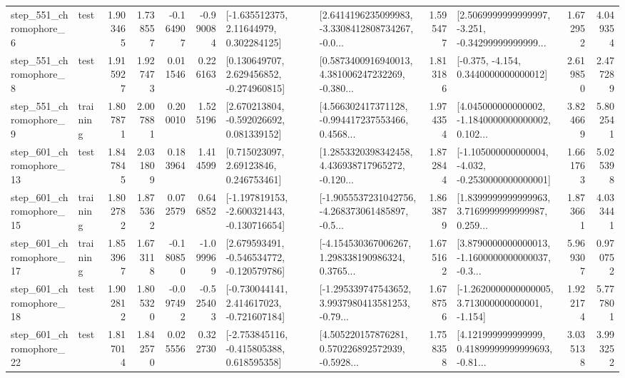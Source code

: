 \begin{tabular}{llrrrrllrlrr}
   step\_551\_chromophore\_6 &      test &      1.903465 &    1.738557 &     -0.164907 & -0.990084 &     [-1.635512375, 2.11644979, 0.302284125] &  [2.6414196235099983, -3.3308412808734267, -0.0... &       1.595477 &  [2.5069999999999997, -3.251, -0.34299999999999... &            1.672952 &          4.049354 \\
   step\_551\_chromophore\_8 &      test &      1.915927 &    1.927473 &      0.011546 &  0.226163 &    [0.130649707, 2.629456852, -0.274960815] &  [0.5873400916940013, 4.381006247232269, -0.380... &       1.813186 &               [-0.375, -4.154, 0.3440000000000012] &            2.619850 &          2.477289 \\
   step\_551\_chromophore\_9 &  training &      1.807871 &    2.007881 &      0.200010 &  1.525196 &    [2.670213804, -0.592026692, 0.081339152] &  [4.566302417371128, -0.994417237553466, 0.4568... &       1.974354 &  [4.045000000000002, -1.1840000000000002, 0.102... &            3.824669 &          5.802541 \\
  step\_601\_chromophore\_13 &      test &      1.847845 &    2.031809 &      0.183964 &  1.414599 &      [0.715023097, 2.69123846, 0.246753461] &  [1.2853320398342458, 4.436938717965272, -0.120... &       1.872844 &  [-1.105000000000004, -4.032, -0.2530000000000001] &            1.661763 &          5.025398 \\
  step\_601\_chromophore\_15 &  training &      1.802782 &    1.875362 &      0.072579 &  0.646852 &  [-1.197819153, -2.600321443, -0.130716654] &  [-1.9055537231042756, -4.268373061485897, -0.5... &       1.863879 &  [1.8399999999999963, 3.7169999999999987, 0.259... &            1.873661 &          4.033441 \\
  step\_601\_chromophore\_17 &  training &      1.853967 &    1.673118 &     -0.180850 & -1.099969 &   [2.679593491, -0.546534772, -0.120579786] &  [-4.154530367006267, 1.298338190986324, 0.3765... &       1.675162 &  [3.8790000000000013, -1.1600000000000037, -0.3... &            5.969307 &          0.970752 \\
  step\_601\_chromophore\_18 &      test &      1.902812 &    1.805320 &     -0.097492 & -0.525403 &   [-0.730044141, 2.414617023, -0.721607184] &  [-1.295339747543652, 3.9937980413581253, -0.79... &       1.678756 &   [-1.2620000000000005, 3.713000000000001, -1.154] &            1.922174 &          5.777801 \\
  step\_601\_chromophore\_22 &      test &      1.817014 &    1.842570 &      0.025556 &  0.322730 &   [-2.753845116, -0.415805388, 0.618595358] &  [4.505220157876281, 0.570226892572939, -0.5928... &       1.758358 &  [4.121999999999999, 0.41899999999999693, -0.81... &            3.035138 &          3.993252 \\

\end{tabular}

